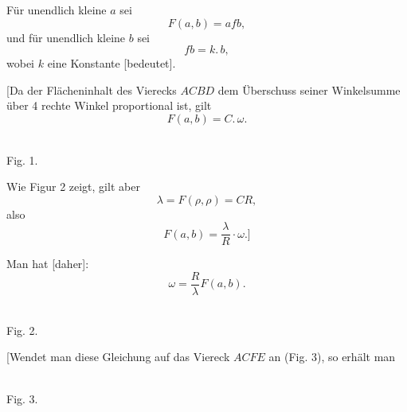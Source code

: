 %
Für unendlich kleine $a$ sei
\[
F(a, b) = afb,
\]
und für unendlich kleine $b$ sei
\[
fb = k.\,b,
\]
wobei $k$ eine Konstante [bedeutet].

[Da der Flächeninhalt des Vierecks $ACBD$ dem Überschuss seiner Winkelsumme über 4 rechte Winkel proportional ist, gilt
\[
F(a, b) = C.\,\omega.
\]

\begin{center}\begin{minipage}{\linewidth}\centering\\[3pt]Fig. 1.\end{minipage}\end{center}

Wie Figur 2 zeigt, gilt aber
\[
\lambda = F(\rho, \rho) = CR,
\]
also
\[
F(a,b) = \frac{\lambda}{R}\cdot\omega.]
\]

Man hat [daher]:
\[
\tag*{1)} \omega = \frac{R}{\lambda} F(a,b).
\]

\begin{center}\begin{minipage}{\linewidth}\centering\\[3pt]Fig. 2.\end{minipage}\end{center}

[Wendet man diese Gleichung auf das Viereck $ACFE$ an (Fig. 3), so erhält man

\begin{center}\begin{minipage}{\linewidth}\centering\\[3pt]Fig. 3.\end{minipage}\end{center}
